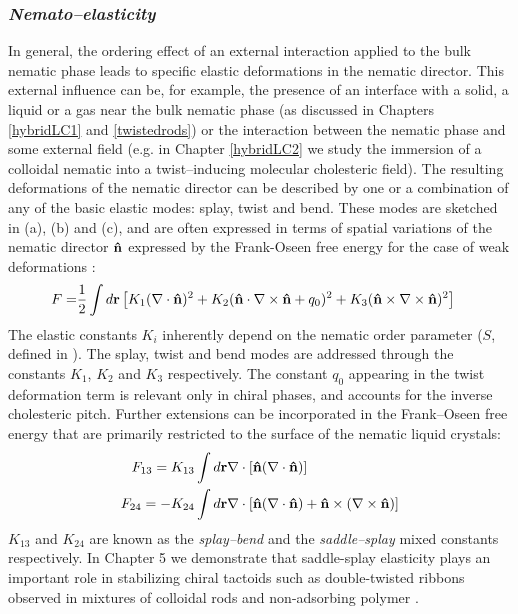 \subsubsection{\em {Nemato--elasticity}}

In general, the ordering effect of an external interaction applied to the bulk nematic phase leads to specific elastic deformations in the nematic director. This external influence can be, for example, the presence of an interface with a solid, a liquid or a gas near the bulk nematic phase (as discussed in Chapters \ref{hybridLC1} and \ref{twistedrods}) or the interaction between the nematic phase and some external field (e.g. in Chapter \ref{hybridLC2} we study the immersion of a colloidal nematic into a twist--inducing molecular cholesteric field). The resulting deformations of the nematic director can be described by one or a combination of any of the basic elastic modes: splay, twist and bend. These modes are sketched in  (a), (b) and (c), and are often expressed in terms of spatial variations of the nematic director ${\bf \hat{n}}$ expressed by the Frank-Oseen free energy for the case of weak deformations \cite{gennes-prost}:
\begin{align}
F = & \frac{1}{2} \int d {\bf r} \left [ K_{1} (\nabla \cdot {\bf \hat{n}})^{2}  + K_{2} ({\bf \hat{n}} \cdot \nabla \times {\bf \hat{n}} + q_{0})^{2}  +   K_{3} ({\bf \hat{n}} \times \nabla \times {\bf \hat{n}})^{2} \right ]
    \label{frankoseen}
\end{align}
The elastic constants $K_i$ inherently depend on the nematic order parameter ($S$, defined in ). The splay, twist and bend modes are addressed through the constants $K_1$, $K_2$ and $K_3$ respectively. The constant $q_0$ appearing in the twist deformation term is relevant only in chiral phases, and accounts for the inverse cholesteric pitch. Further extensions can be incorporated in the Frank--Oseen free energy that are primarily restricted to the surface of the nematic liquid crystals:
\begin{align}
F_{13} = K_{13} & \int d {\bf r}  \nabla \cdot \left[{\bf \hat{n}}(\nabla \cdot {\bf \hat{n}})\right] \\
F_{24} = -K_{24} & \int d {\bf r} \nabla \cdot \left[{\bf \hat{n}}(\nabla \cdot {\bf \hat{n}}) + {\bf \hat{n}} \times (\nabla \times {\bf \hat{n}})\right]
\end{align}
$K_{13}$ and $K_{24}$ are known as the {\em splay--bend} and the {\em saddle--splay} mixed constants respectively. In Chapter 5 we demonstrate that saddle-splay elasticity plays an important role in stabilizing chiral tactoids such as double-twisted ribbons observed in mixtures of colloidal rods and non-adsorbing polymer \cite{Gibaud2012}.

